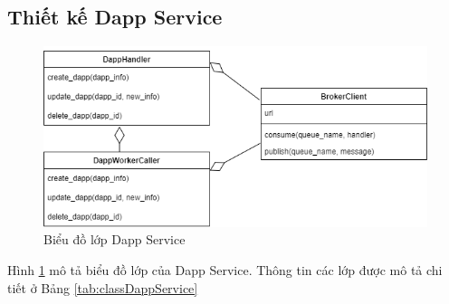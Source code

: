 \documentclass[../DoAn.tex]{subfiles}
\begin{document}
\subsection{Thiết kế Dapp Service}

\begin{figure}[H]
    \centering
    \includegraphics[width=0.75\linewidth]{Hinhve/DoAn-ClassDappService.drawio.png}
    \caption{Biểu đồ lớp Dapp Service}
    \label{fig:classDappService}
\end{figure}

Hình \ref{fig:classDappService} mô tả biểu đồ lớp của Dapp Service. Thông tin
các lớp được mô tả chi tiết ở Bảng \ref{tab:classDappService}
\end{document}
